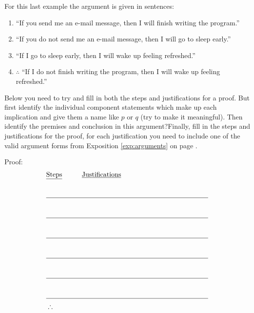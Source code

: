 \clearpage




\begin{practiceprob} For this last example the argument is given in sentences:
    \begin{enumerate}
    \setlength\itemsep{1.5\baselineskip}
        \item ``If you send me an e-mail message, then I will finish writing the program.''
        \item ``If you do not send me an e-mail message, then I will go to sleep early.''
        \item ``If I go to sleep early, then I will wake up feeling refreshed.''
        \item \(\therefore\) ``If I do not finish writing the program, then I will wake up feeling refreshed.''
    \end{enumerate}
    Below you need to try and fill in both the steps and justifications for a proof.  But first identify the individual component statements which make up each implication and give them a name like \(p\) or \(q\) (try to make it meaningful). Then identify the premises and conclusion in this argument?\vspace{6\baselineskip}\newline Finally, fill in the steps and justifications for the proof, for each justification you need to include one of the valid argument forms from Exposition \ref{exp:arguments} on page \pageref{exp:arguments}.

    \noindent
    Proof:
    \begin{align}
        &\text{\underline{Steps}} &&\text{\underline{Justifications}}\nonumber\\
        & \phantom{\sim r \rightarrow \sim t} && \phantom{Step (??) and Step (??) and Some Logical Law}\\ \cline{1-4}
        & \phantom{\sim r \rightarrow \sim t} && \phantom{Step (??) and Step (??) and Some Logical Law}\\ \cline{1-4}
        & \phantom{\sim r \rightarrow \sim t} && \phantom{Step (??) and Step (??) and Some Logical Law}\\ \cline{1-4}
        & \phantom{\sim r \rightarrow \sim t} && \phantom{Step (??) and Step (??) and Some Logical Law}\\ \cline{1-4}
        & \phantom{\sim r \rightarrow \sim t} && \phantom{Step (??) and Step (??) and Some Logical Law}\\ \cline{1-4}
        & \phantom{\sim r \rightarrow \sim t} && \phantom{Step (??) and Step (??) and Some Logical Law}\\ \cline{1-4}
        &\therefore 
    \end{align}
\end{practiceprob}
